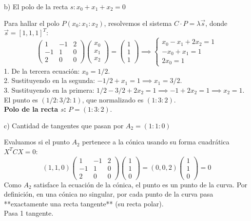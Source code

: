 {b) El polo de la recta $s : x_0 + x_1 + x_2 = 0$

Para hallar el polo $P(x_0:x_1:x_2)$, resolvemos el sistema $C \cdot P = \lambda \vec{s}$, donde $\vec{s} = [1, 1, 1]^T$:
\[
\begin{pmatrix} 1 & -1 & 2 \\ -1 & 1 & 0 \\ 2 & 0 & 0 \end{pmatrix} \begin{pmatrix} x_0 \\ x_1 \\ x_2 \end{pmatrix} = \begin{pmatrix} 1 \\ 1 \\ 1 \end{pmatrix} \implies
\begin{cases} 
x_0 - x_1 + 2x_2 = 1 \\ 
-x_0 + x_1 = 1 \\ 
2x_0 = 1 
\end{cases}
\]
1. De la tercera ecuación: $x_0 = 1/2$. \\
2. Sustituyendo en la segunda: $-1/2 + x_1 = 1 \implies x_1 = 3/2$. \\
3. Sustituyendo en la primera: $1/2 - 3/2 + 2x_2 = 1 \implies -1 + 2x_2 = 1 \implies x_2 = 1$. \\
El punto es $(1/2 : 3/2 : 1)$, que normalizado es $(1 : 3 : 2)$. \\
\textbf{Polo de la recta $s$:} $P = (1 : 3 : 2)$.

c) Cantidad de tangentes que pasan por $A_2 = (1 : 1 : 0)$

Evaluamos si el punto $A_2$ pertenece a la cónica usando su forma cuadrática $X^T C X = 0$:
\[
(1, 1, 0) \begin{pmatrix} 1 & -1 & 2 \\ -1 & 1 & 0 \\ 2 & 0 & 0 \end{pmatrix} \begin{pmatrix} 1 \\ 1 \\ 0 \end{pmatrix} = (0, 0, 2) \begin{pmatrix} 1 \\ 1 \\ 0 \end{pmatrix} = 0
\]
Como $A_2$ satisface la ecuación de la cónica, el punto es un punto de la curva. Por definición, en una cónica no singular, por cada punto de la curva pasa **exactamente una recta tangente** (su recta polar). \\
Pasa 1 tangente.

}
